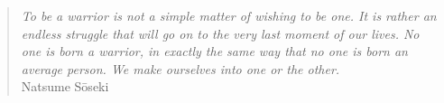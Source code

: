 \phantom{.}
\vspace{4in}

\begin{singlespace}
\begin{quote}
  \textit{To be a warrior is not a simple matter of wishing to be one. It is rather an endless struggle that will go on to the very last moment of our lives. No one is born a warrior, in exactly the same way that no one is born an average person. We make ourselves into one or the other.}\\\hfill{Natsume S\=oseki}\\
\end{quote}
\end{singlespace}

%
